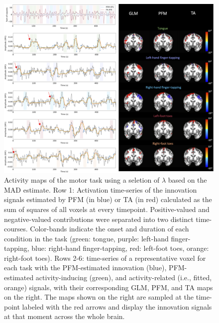\begin{figure}[t!]
    \begin{center}
        \includegraphics[width=\textwidth]{figures/task_maps.png}
    \end{center}
    \caption{Activity maps of the motor task using a seletion of $\lambda$ based on the MAD estimate. Row 1: Activation time-series of the innovation signals estimated by PFM (in blue) or TA (in red) calculated as the sum of squares of all voxels at every timepoint. Positive-valued and negative-valued contributions were separated into two distinct time-courses. Color-bands indicate the onset and duration of each condition in the task (green: tongue, purple: left-hand finger-tapping, blue: right-hand finger-tapping, red: left-foot toes, orange: right-foot toes). Rows 2-6: time-series of a representative voxel for each task with the PFM-estimated innovation (blue), PFM-estimated activity-inducing (green), and activity-related (i.e., fitted, orange) signals, with their corresponding GLM, PFM, and TA maps on the right. The maps shown on the right are sampled at the time-point labeled with the red arrows and display the innovation signals at that moment across the whole brain.}
\label{fig:task_maps}
\end{figure}

